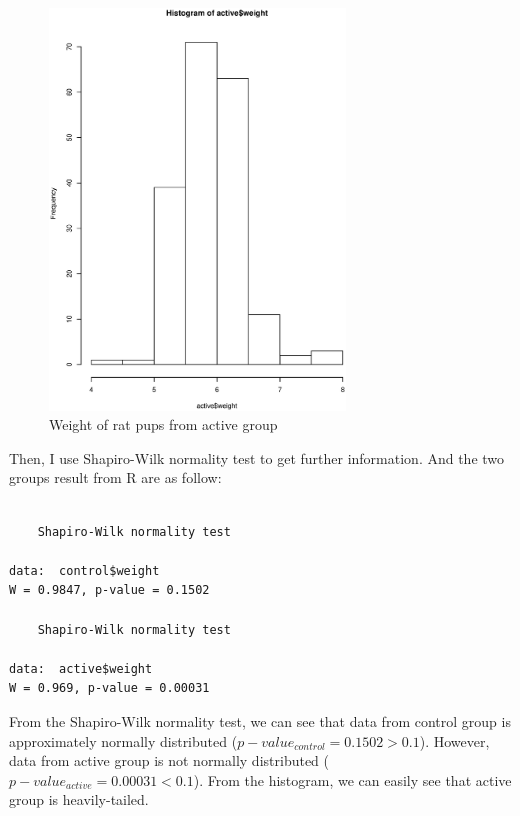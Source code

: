\documentclass[12pt]{article}
\begin{document}
\begin{enumerate}
\begin{enumerate}
    \begin{figure}[ht!]
      \centering
      \includegraphics[width=0.7\textwidth]{hist_active}
      \caption{Weight of rat pups from active group \label{fig:hista}}
    \end{figure}

    Then, I use Shapiro-Wilk normality test to get further
    information. And the two groups result from R are as follow:

\begin{verbatim}

	Shapiro-Wilk normality test

data:  control$weight 
W = 0.9847, p-value = 0.1502

	Shapiro-Wilk normality test

data:  active$weight 
W = 0.969, p-value = 0.00031

\end{verbatim}

    From the Shapiro-Wilk normality test, we can see that data from
    control group is approximately normally distributed
    ($ p-value_{control}  = 0.1502 > 0.1 $). However, data from active
    group is not normally distributed ($ p-value_{active}  = 0.00031 <
    0.1 $). From the histogram, we can easily see that active group is
    heavily-tailed. 


\end{enumerate}
\end{enumerate}
\end{document}
